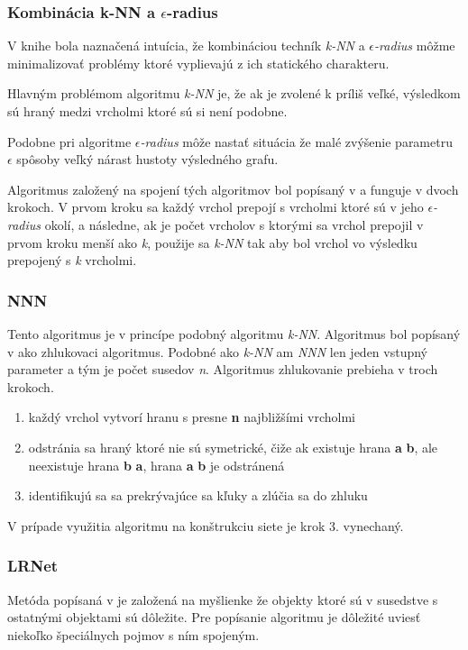 \documentclass[slovak,master,dept460,male,cpp,cpdeclaration]{diploma}
\begin{document}
\subsubsection{Kombinácia k-NN a $\epsilon$-radius}
V knihe \cite{godbook} bola naznačená intuícia, že kombináciou techník\textit{ k-NN} a \textit{$\epsilon$-radius} môžme minimalizovať problémy ktoré vyplievajú z ich statického charakteru.

Hlavným problémom algoritmu \textit{k-NN} je, že ak je zvolené k príliš veľké, výsledkom sú hraný medzi vrcholmi ktoré sú si není podobne.

Podobne pri algoritme \textit{$\epsilon$-radius} môže nastať situácia že malé zvýšenie parametru $\epsilon$ spôsoby veľký nárast hustoty výsledného grafu.

Algoritmus založený na spojení tých algoritmov bol popísaný v \cite{godbook} a funguje v dvoch krokoch. V prvom kroku sa každý vrchol prepojí s vrcholmi ktoré sú v jeho \textit{$\epsilon$-radius} okolí, a následne, ak je počet vrcholov s ktorými sa vrchol prepojil v prvom kroku menší ako \textit{k}, použije sa \textit{k-NN} tak aby bol vrchol vo výsledku prepojený s \textit{k} vrcholmi.
\subsubsection{NNN}
Tento algoritmus je v princípe podobný algoritmu \textit{k-NN}. Algoritmus bol popísaný v \cite{NNN} ako zhlukovaci algoritmus. Podobné ako \textit{k-NN} am \textit{NNN} len jeden vstupný parameter a tým je počet susedov \textit{n}.
Algoritmus zhlukovanie prebieha v troch krokoch.
\begin{enumerate}
\item každý vrchol vytvorí hranu s presne \textbf{n} najbližšími vrcholmi
\item odstránia sa hraný ktoré nie sú symetrické, čiže ak  existuje hrana \textbf{a} \textrightarrow{} \textbf{b}, ale neexistuje hrana \textbf{b} \textrightarrow{} \textbf{a}, hrana  \textbf{a} \textrightarrow{} \textbf{b} je odstránená
\item identifikujú sa  sa prekrývajúce sa kľuky a zlúčia sa do zhluku
\end{enumerate}
V prípade využitia algoritmu na konštrukciu siete je krok 3. vynechaný.
\subsubsection{LRNet}
Metóda popísaná v  \cite{lrntet} je založená na myšlienke že objekty ktoré sú v susedstve s ostatnými objektami sú dôležite. Pre popísanie algoritmu je dôležité uviesť niekoľko špeciálnych pojmov s ním spojeným.
\end{document}
